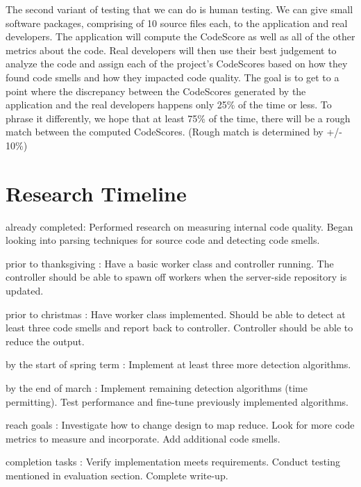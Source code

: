 \documentclass{sig-alternate}
\begin{document}
The second variant of testing that we can do is human testing. We can give small software packages, comprising of 10 source files each, to the application and real developers. The application will compute the CodeScore as well as all of the other metrics about the code. Real developers will then use their best judgement to analyze the code and assign each of the project's CodeScores based on how they found code smells and how they impacted code quality. The goal is to get to a point where the discrepancy between the CodeScores generated by the application and the real developers happens only 25\% of the time or less. To phrase it differently, we hope that at least 75\% of the time, there will be a rough match between the computed CodeScores. (Rough match is determined by +/- 10\%)

\section{Research Timeline}
\label{sec:research_timeline}
\begin{itemize*}
	\item {\sc already completed}: Performed research on measuring internal code quality. Began looking into parsing techniques for source code and detecting code smells.\vspace{3pt}
	\item {\sc prior to thanksgiving} : Have a basic worker class and controller running. The controller should be able to spawn off workers when the server-side repository is updated.\vspace{3pt}
	\item {\sc prior to christmas} : Have worker class implemented. Should be able to detect at least three code smells and report back to controller. Controller should be able to reduce the output.\vspace{3pt}
\item {\sc by the start of spring term} : Implement at least three more detection algorithms.\vspace{3pt}	
\item {\sc by the end of march} : Implement remaining detection algorithms (time permitting). Test performance and fine-tune previously implemented algorithms. \vspace{3pt}
\item {\sc reach goals} : Investigate how to change design to map reduce. Look for more code metrics to measure and incorporate. Add additional code smells. \vspace{3pt}
\item {\sc completion tasks} : Verify implementation meets requirements. Conduct testing mentioned in evaluation section. Complete write-up.\vspace{3pt}
\end{itemize*}
\end{document}
